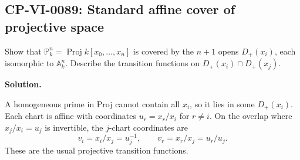 
\subsection*{CP-VI-0089: Standard affine cover of projective space}

Show that $\mathbb P_k^n=\operatorname{Proj}k[x_0,\dots,x_n]$ is covered by the $n+1$ opens $D_+(x_i)$, each isomorphic to $\mathbb A_k^n$. Describe the transition functions on $D_+(x_i)\cap D_+(x_j)$.

\medskip
\noindent\textbf{Solution.}

A homogeneous prime in Proj cannot contain all $x_i$, so it lies in some $D_+(x_i)$. Each chart is affine with coordinates $u_r=x_r/x_i$ for $r\ne i$. On the overlap where $x_j/x_i=u_j$ is invertible, the $j$-chart coordinates are
\[
v_i=x_i/x_j=u_j^{-1},\qquad v_r=x_r/x_j=u_r/u_j.
\]
These are the usual projective transition functions.
